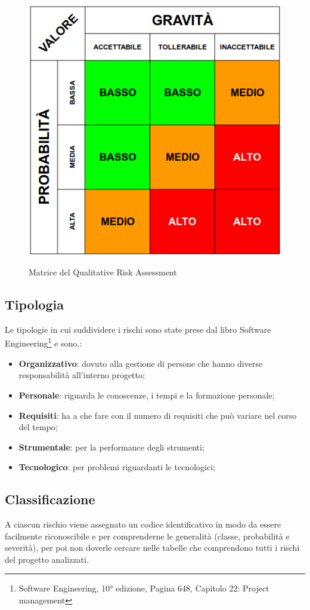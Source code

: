 	\begin{figure}[H]
		\centering
		\includegraphics[scale=0.5]{img/risk_assessment_table.png}\\
		\caption{Matrice del Qualitative Risk Assessment}
	\end{figure}
	\subsection{Tipologia}
	Le tipologie in cui suddividere i rischi sono state prese dal libro Software Engineering\footnote{Software Engineering, 10° edizione, Pagina 648, Capitolo 22: Project management} e sono,:
	\begin{itemize}
 		\item \textbf{Organizzativo}: dovuto alla gestione di persone che hanno diverse responsabilità all'interno progetto;
		\item \textbf{Personale}: riguarda le conoscenze, i tempi e la formazione personale;
		\item \textbf{Requisiti}: ha a che fare con il numero di requisiti che può variare nel corso del tempo;
		\item \textbf{Strumentale}: per la performance degli strumenti;
		\item \textbf{Tecnologico}: per problemi riguardanti le tecnologici;
	\end{itemize}
	\subsection{Classificazione}
	A ciascun rischio viene assegnato un codice identificativo in modo da essere facilmente riconoscibile e per comprenderne le generalità (classe, probabilità e severità), per poi non doverle cercare nelle tabelle che comprendono tutti i rischi del progetto analizzati.
	
